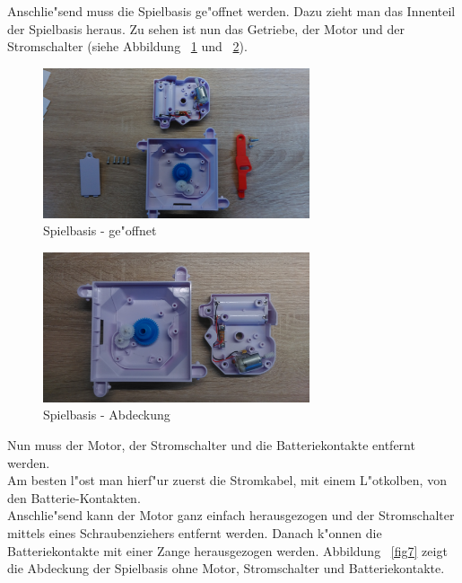Anschlie"send muss die Spielbasis ge"offnet werden. Dazu zieht man das Innenteil der Spielbasis heraus.
Zu sehen ist nun das Getriebe, der Motor und der Stromschalter (siehe Abbildung ~\ref{fig4} und ~\ref{fig5}). 

\vspace{1cm}
\begin{figure}[!ht]
	\centering
  	\includegraphics[width=0.7\textwidth]{pictures/loolou_004.jpg}
	\caption{Spielbasis - ge"offnet}
	\label{fig4}
\end{figure}
\vspace{1cm}
\begin{figure}[!ht]
	\centering
  	\includegraphics[width=0.7\textwidth]{pictures/loolou_005.jpg}
	\caption{Spielbasis - Abdeckung}
	\label{fig5}
\end{figure}
\vspace{0.5cm}


Nun muss der Motor, der Stromschalter und die Batteriekontakte entfernt werden. \\
Am besten l"ost man hierf"ur zuerst die Stromkabel, mit einem L"otkolben, von den Batterie-Kontakten. \\
Anschlie"send kann der Motor ganz einfach herausgezogen und der Stromschalter mittels eines Schraubenziehers entfernt werden.
Danach k"onnen die Batteriekontakte mit einer Zange herausgezogen werden.
Abbildung ~\ref{fig7} zeigt die Abdeckung der Spielbasis ohne Motor, Stromschalter und Batteriekontakte.


